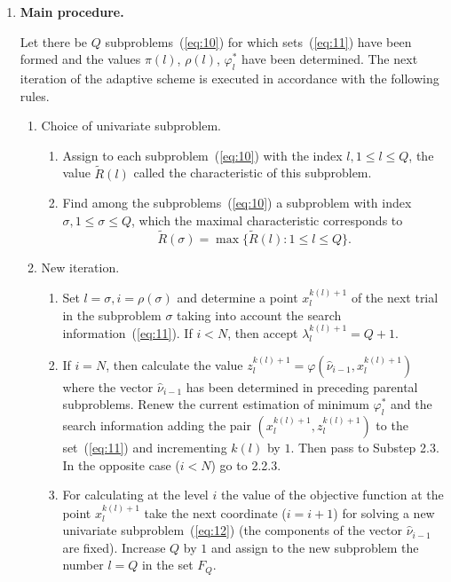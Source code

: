 \documentclass[smallextended]{svjour3}
\let\origref\ref
\renewcommand{\ref}[1]{(\origref{#1})}
\begin{document}
\begin{enumerate}[label=\bfseries Step \arabic*., leftmargin=*]
  \vspace{3 mm}
  \item \textbf{Main procedure.}
  \begin{adjustwidth}{-4em}{}
    Let there be $Q$ subproblems~\ref{eq:10} for which sets~\ref{eq:11} have been formed and the values $\pi(l)$, $\rho(l)$, $\varphi_l^*$ have been determined. The next iteration of the adaptive scheme is executed in accordance with the following rules.
  \end{adjustwidth}
  \begin{enumerate}[label=\arabic{enumi}.\arabic*., leftmargin=-2em]
    \item Choice of univariate subproblem.
    \begin{enumerate}[label=\arabic{enumi}.\arabic{enumii}.\arabic*., leftmargin=*]
      \item Assign to each subproblem~\ref{eq:10} with the index $l, 1 \leq l \leq Q$, the value $\widetilde{R}(l)$ called the characteristic of this subproblem.
      \item Find among the subproblems~\ref{eq:10} a subproblem with index $\sigma, 1 \leq \sigma \leq Q$, which the maximal characteristic corresponds to
      \begin{equation}
      \label{eq:13}
      \widetilde{R}(\sigma) = \max \big\{ \widetilde{R}(l): 1 \leq l \leq Q \big\}.
      \end{equation}
    \end{enumerate}
    \item New iteration.
    \begin{enumerate}[label=\arabic{enumi}.\arabic{enumii}.\arabic*., leftmargin=*]
      \item Set $l = \sigma, i = \rho(\sigma)$ and determine a point $x_l^{k(l) + 1}$ of the next trial in the subproblem $\sigma$ taking into account the search information~\ref{eq:11}. If $i < N$, then accept $\lambda_l^{k(l) + 1} = Q + 1$.

      \item If $i = N$, then calculate the value $z_l^{k(l) + 1} = \varphi(\hat{\nu}_{i - 1}, x_l^{k(l) + 1})$ where the vector $\hat{\nu}_{i - 1}$ has been determined in preceding parental subproblems. Renew the current estimation of minimum $\varphi_l^*$ and the search information adding the pair $(x_l^{k(l) + 1}, z_l^{k(l) + 1})$ to the set~\ref{eq:11} and incrementing $k(l)$ by $1$. Then pass to Substep 2.3. In the opposite case ($i < N$) go to 2.2.3.

      \item For calculating at the level $i$ the value of the objective function at the point $x_l^{k(l) + 1}$ take the next coordinate ($i = i + 1$) for solving a new univariate subproblem~\ref{eq:12} (the components of the vector $\hat{\nu}_{i - 1}$ are fixed). Increase $Q$ by $1$ and assign to the new subproblem the number $l = Q$ in the set $F_Q$.


\end{enumerate}
\end{enumerate}
\end{enumerate}
\end{document}
